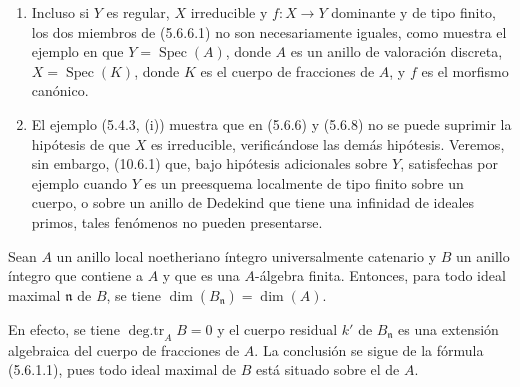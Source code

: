 \begin{remarks}[5.6.9]
\label{IV.2.s5.6.9-fr}
\begin{enumerate}
\item[(i)] Incluso si $Y$ es regular, $X$ irreducible y $f:X\to Y$ dominante
y de tipo finito, los dos miembros de (5.6.6.1) no son necesariamente iguales,
como muestra el ejemplo en que $Y=\operatorname{Spec}(A)$, donde $A$ es un
anillo de valoración discreta, $X=\operatorname{Spec}(K)$, donde $K$ es el
cuerpo de fracciones de $A$, y $f$ es el morfismo canónico.
\item[(ii)] El ejemplo (5.4.3, (i)) muestra que en (5.6.6) y (5.6.8) no se
puede suprimir la hipótesis de que $X$ es irreducible, verificándose las demás
hipótesis. Veremos, sin embargo, (10.6.1) que, bajo hipótesis adicionales sobre
$Y$, satisfechas por ejemplo cuando $Y$ es un preesquema localmente de tipo
finito sobre un cuerpo, o sobre un anillo de Dedekind que tiene una infinidad
de ideales primos, tales fenómenos no pueden presentarse.
\end{enumerate}
\end{remarks}

\begin{proposition}[5.6.10]
\label{IV.2.s5.6.10-fr}
Sean $A$ un anillo local noetheriano íntegro universalmente catenario y $B$
un anillo íntegro que contiene a $A$ y que es una $A$-álgebra finita. Entonces,
para todo ideal maximal $\mathfrak n$ de $B$, se tiene
$\dim(B_{\mathfrak n})=\dim(A)$.
\end{proposition}

En efecto, se tiene $\operatorname{deg.tr}_A B=0$ y el cuerpo residual $k'$
de $B_{\mathfrak n}$ es una extensión algebraica del cuerpo de fracciones de
$A$. La conclusión se sigue de la fórmula (5.6.1.1), pues todo ideal maximal
de $B$ está situado sobre el de $A$.

